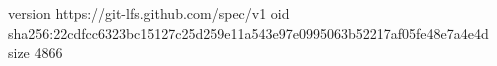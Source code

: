 version https://git-lfs.github.com/spec/v1
oid sha256:22cdfcc6323bc15127c25d259e11a543e97e0995063b52217af05fe48e7a4e4d
size 4866
